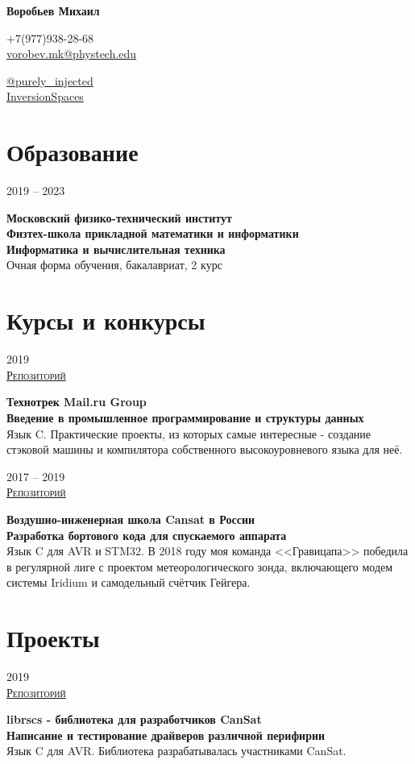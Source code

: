 \documentclass{article}
\makeatletter
\renewcommand{\maketitle}{
    \Huge
    \begin{center}
        \textbf{Воробьев Михаил}
    \end{center}

    \large
    \begin{minipage}{0.4\textwidth}
        \faMobile \hspace{0.1cm} $\boldsymbol{+}$7(977)938-28-68\\[0.3em]
        \faEnvelope \hspace{0.1cm} \href{mailto:vorobev.mk@phystech.edu}{vorobev.mk@phystech.edu}
    \end{minipage}
    \hfill
    \begin{minipage}{0.4\textwidth}
        \begin{flushright}
            \faPaperPlane \hspace{0.1cm} \href{https://t.me/purely_injected}{@purely\_injected}\\[0.3em]
            \faGithub \hspace{0.1cm} \href{https://github.com/InversionSpaces}{InversionSpaces}
        \end{flushright}
    \end{minipage}
}
\newcommand{\entry}[3]{
    \begin{minipage}[t]{.11\linewidth}
        \hfill \textsc{#1}
    \end{minipage}
    \hfill\vline\hfill
    \begin{minipage}[t]{.80\linewidth}
        \textbf{#2}\\
        \footnotesize{#3}
    \end{minipage}
}
\makeatother
\begin{document}
    \maketitle
    \small
    
    \section{Образование}
        \entry {2019 -- 2023}
        {Московский физико-технический институт\\
         Физтех-школа прикладной математики и информатики\\
         Информатика и вычислительная техника}
        {Очная форма обучения, бакалавриат, 2 курс}


    \section{Курсы и конкурсы}
        \entry {2019 \\
        \href {https://github.com/InversionSpaces/problems} {Репозиторий} }
        {Технотрек Mail.ru Group\\
        Введение в промышленное программирование и структуры данных}
        {Язык C. Практические проекты, из которых самые интересные - создание стэковой машины и компилятора собственного высокоуровневого языка для неё. }

        \vspace{.2cm}

        \entry {2017 -- 2019 \\
        \href {https://github.com/Gravifarsh/FreyaCode} {Репозиторий} }
        {Воздушно-инженерная школа Cansat в России\\
        Разработка бортового кода для спускаемого аппарата}
        {Язык C для AVR и STM32. В 2018 году моя команда <<Гравицапа>> победила в регулярной лиге с проектом метеорологического зонда, включающего модем системы Iridium и самодельный счётчик Гейгера. }        

    \section{Проекты}
    \entry {2019 \\
    \href {https://github.com/cansat-rsce/librscs} {Репозиторий} }
    {librscs - библиотека для разработчиков CanSat \\
    Написание и тестирование драйверов различной перифирии}
    {Язык C для AVR. Библиотека разрабатывалась участниками CanSat.} 
    
\end{document}
